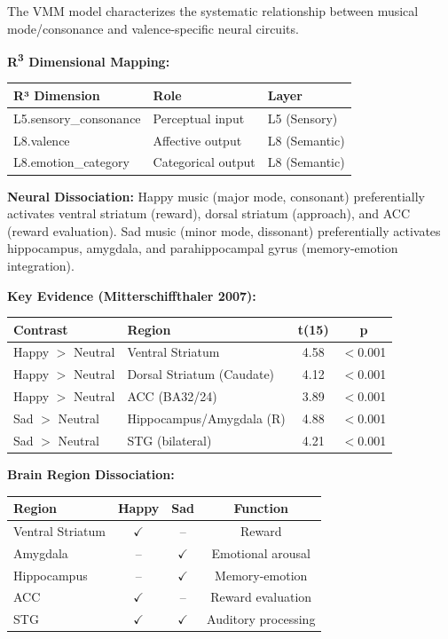 \documentclass[9pt,onecolumn]{article}
\newcommand{\Rthree}{R\textsuperscript{3}}
\begin{document}
The VMM model characterizes the systematic relationship between musical mode/consonance and valence-specific neural circuits.

\textbf{\Rthree{} Dimensional Mapping:}
\begin{center}
\small
\begin{tabular}{@{}lll@{}}
\toprule
\textbf{R³ Dimension} & \textbf{Role} & \textbf{Layer} \\
\midrule
L5.sensory\_consonance & Perceptual input & L5 (Sensory) \\
L8.valence & Affective output & L8 (Semantic) \\
L8.emotion\_category & Categorical output & L8 (Semantic) \\
\bottomrule
\end{tabular}
\end{center}

\textbf{Neural Dissociation:} Happy music (major mode, consonant) preferentially activates ventral striatum (reward), dorsal striatum (approach), and ACC (reward evaluation). Sad music (minor mode, dissonant) preferentially activates hippocampus, amygdala, and parahippocampal gyrus (memory-emotion integration).

\textbf{Key Evidence (Mitterschiffthaler 2007):}
\begin{center}
\small
\begin{tabular}{@{}llcc@{}}
\toprule
\textbf{Contrast} & \textbf{Region} & \textbf{t(15)} & \textbf{p} \\
\midrule
Happy $>$ Neutral & Ventral Striatum & 4.58 & $<$0.001 \\
Happy $>$ Neutral & Dorsal Striatum (Caudate) & 4.12 & $<$0.001 \\
Happy $>$ Neutral & ACC (BA32/24) & 3.89 & $<$0.001 \\
Sad $>$ Neutral & Hippocampus/Amygdala (R) & 4.88 & $<$0.001 \\
Sad $>$ Neutral & STG (bilateral) & 4.21 & $<$0.001 \\
\bottomrule
\end{tabular}
\end{center}

\textbf{Brain Region Dissociation:}
\begin{center}
\small
\begin{tabular}{@{}lccc@{}}
\toprule
\textbf{Region} & \textbf{Happy} & \textbf{Sad} & \textbf{Function} \\
\midrule
Ventral Striatum & $\checkmark$ & -- & Reward \\
Amygdala & -- & $\checkmark$ & Emotional arousal \\
Hippocampus & -- & $\checkmark$ & Memory-emotion \\
ACC & $\checkmark$ & -- & Reward evaluation \\
STG & $\checkmark$ & $\checkmark$ & Auditory processing \\
\bottomrule
\end{tabular}
\end{center}
\end{document}
